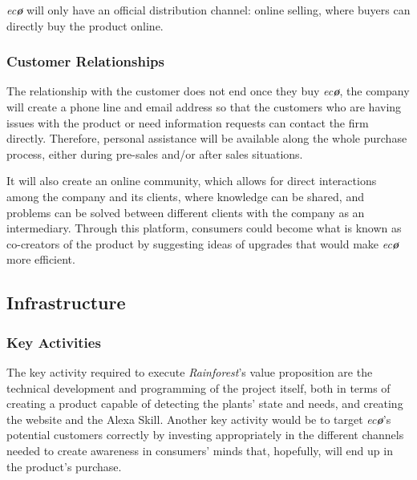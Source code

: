 \documentclass[english,runningheads,a4paper]{llncs}[2018/03/10]
\begin{document}
        \textit{ec\textbf{\o}} will only have an official distribution channel:
        online selling, where buyers can directly buy the product online.


        \subsubsection*{Customer Relationships}

        The relationship with the customer does not end once they buy
        \textit{ec\textbf{\o}}, the company will create a phone line and email
        address so that the customers who are having issues with the product or
        need information requests can contact the firm directly. Therefore,
        personal assistance will be available along the whole purchase process,
        either during pre-sales and/or after sales situations.

        It will also create an online community, which allows for direct
        interactions among the company and its clients, where knowledge can be
        shared, and problems can be solved between different clients with the
        company as an intermediary. Through this platform, consumers could
        become what is known as co-creators of the product by suggesting ideas
        of upgrades that would make \textit{ec\textbf{\o}} more efficient.


    \subsection*{Infrastructure}

        \subsubsection*{Key Activities}

        The key activity required to execute \textit{Rainforest}'s value
        proposition are the technical development and programming of the project
        itself, both in terms of creating a product capable of detecting the
        plants' state and needs, and creating the website and the Alexa Skill.
        Another key activity would be to target \textit{ec\textbf{\o}}'s
        potential customers correctly by investing appropriately in the
        different channels needed to create awareness in consumers' minds that,
        hopefully, will end up in the product's purchase.
\end{document}
